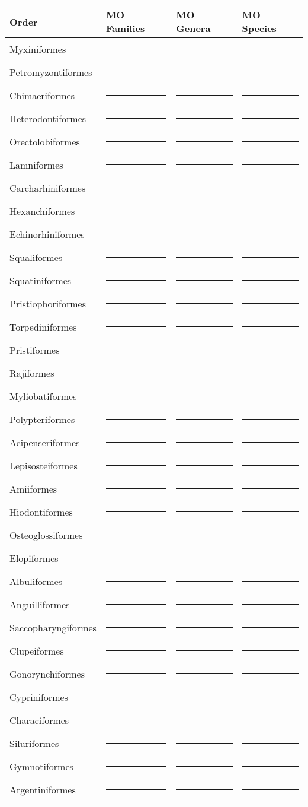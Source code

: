 \documentclass[12pt]{exam}
\newcommand{\tableblank}{\rule{0.8in}{0.4pt}}
\begin{document}
{\renewcommand{\arraystretch}{1.21}
\begin{longtable}[l]{@{}llll@{}}
\toprule
Order & MO Families & MO Genera & MO Species \tabularnewline
\midrule
\endhead
Myxiniformes & \tableblank & \tableblank & \tableblank \tabularnewline
Petromyzontiformes & \tableblank & \tableblank  & \tableblank \tabularnewline
Chimaeriformes & \tableblank & \tableblank  & \tableblank \tabularnewline
Heterodontiformes & \tableblank & \tableblank  & \tableblank \tabularnewline
Orectolobiformes & \tableblank & \tableblank  & \tableblank \tabularnewline
Lamniformes & \tableblank & \tableblank  & \tableblank \tabularnewline
Carcharhiniformes & \tableblank & \tableblank  & \tableblank \tabularnewline
Hexanchiformes & \tableblank & \tableblank  & \tableblank \tabularnewline
Echinorhiniformes & \tableblank & \tableblank  & \tableblank \tabularnewline
Squaliformes & \tableblank & \tableblank  & \tableblank \tabularnewline
Squatiniformes & \tableblank & \tableblank  & \tableblank \tabularnewline
Pristiophoriformes & \tableblank & \tableblank  & \tableblank \tabularnewline
Torpediniformes & \tableblank & \tableblank  & \tableblank \tabularnewline
Pristiformes & \tableblank & \tableblank  & \tableblank \tabularnewline
Rajiformes & \tableblank & \tableblank  & \tableblank \tabularnewline
Myliobatiformes & \tableblank & \tableblank  & \tableblank \tabularnewline
Polypteriformes & \tableblank & \tableblank  & \tableblank \tabularnewline
Acipenseriformes & \tableblank & \tableblank  & \tableblank \tabularnewline
Lepisosteiformes & \tableblank & \tableblank  & \tableblank \tabularnewline
Amiiformes & \tableblank & \tableblank  & \tableblank \tabularnewline
Hiodontiformes & \tableblank & \tableblank  & \tableblank \tabularnewline
Osteoglossiformes & \tableblank & \tableblank  & \tableblank \tabularnewline
Elopiformes & \tableblank & \tableblank  & \tableblank \tabularnewline
Albuliformes & \tableblank & \tableblank  & \tableblank \tabularnewline
Anguilliformes & \tableblank & \tableblank  & \tableblank \tabularnewline
Saccopharyngiformes & \tableblank & \tableblank  & \tableblank \tabularnewline
Clupeiformes~ & \tableblank & \tableblank  & \tableblank \tabularnewline
Gonorynchiformes~ & \tableblank & \tableblank  & \tableblank \tabularnewline
Cypriniformes & \tableblank & \tableblank  & \tableblank \tabularnewline
Characiformes & \tableblank & \tableblank  & \tableblank \tabularnewline
Siluriformes & \tableblank & \tableblank  & \tableblank \tabularnewline
Gymnotiformes & \tableblank & \tableblank  & \tableblank \tabularnewline
Argentiniformes & \tableblank & \tableblank  & \tableblank \tabularnewline

\end{longtable}}
\end{document}
